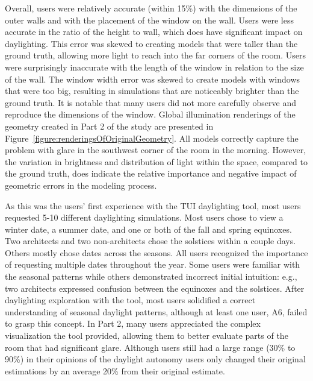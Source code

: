 \documentclass{article}
\begin{document}
Overall, users were relatively accurate (within 15\%) with the
dimensions of the outer walls and with the placement of the window on
the wall.  Users were less accurate in the ratio of the height to
wall, which does have significant impact on daylighting.  
This error was skewed to creating models that were taller than the
ground truth, allowing more light 
to reach
 into the far corners of the
room.  
%
Users were surprisingly inaccurate with the length of the window in
relation to the size of the wall.  The window width error was skewed
to create models with windows that were too big, resulting in
simulations that are noticeably brighter than the ground truth.
It is notable that many users did not 
more 
carefully observe and
reproduce the dimensions of the window.  
%
Global illumination renderings of the geometry created in Part 2 of
the study are presented in
Figure~\ref{figure:renderingsOfOriginalGeometry}.  All models
correctly capture the problem with glare in the southwest corner of
the room in the morning.  However, the variation in brightness and
distribution of light within the space, compared to the ground truth,
does indicate the relative importance and negative impact of geometric
errors in the modeling process.


As this was the users' first experience with the TUI daylighting tool,
most users requested 5-10 different daylighting simulations.  Most
users chose to view a winter date, a summer date, and one or both of
the fall and spring equinoxes.  Two architects and two non-architects
chose the solstices within a couple days.  Others mostly chose dates
across the seasons.  All users recognized the importance of requesting
multiple dates throughout the year.  Some users were familiar with the
seasonal patterns while others demonstrated incorrect initial
intuition: e.g., two architects expressed confusion between the
equinoxes and the solstices.  After daylighting exploration with the
tool, most users solidified a correct understanding of seasonal
daylight patterns, although at least one user, A6, failed to grasp
this concept.  In Part 2, many users appreciated the complex
visualization the tool provided, allowing them to better evaluate
parts of the room that had significant glare.  Although users still
had a large range (30\% to 90\%) in their opinions of the daylight
autonomy users only changed their original estimations by an average
20\% from their original estimate.  
\end{document}
